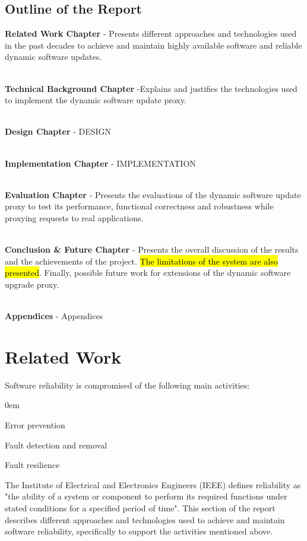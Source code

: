 \documentclass[a4paper,11pt,twoside]{report}
\begin{document}
\section{Outline of the Report}
\textbf{Related Work Chapter} - Presents different approaches and technologies used in the past decades to achieve and maintain highly available software and reliable dynamic software updates. 

\noindent \\
\textbf{Technical Background Chapter} -Explains and justifies the technologies used to implement the dynamic software update proxy.

\noindent \\
\textbf{ Design Chapter} - DESIGN

\noindent \\
\textbf{Implementation Chapter} - IMPLEMENTATION

\noindent \\
\textbf{Evaluation Chapter} - Presents the evaluations of the dynamic software update proxy to test its performance, functional correctness and robustness while proxying requests to real applications. 

\noindent \\
\textbf{Conclusion \& Future Chapter} - Presents the overall discussion of the results and the achievements of the project. \hl{The limitations of the system are also presented}. Finally, possible future work for extensions of the dynamic software upgrade proxy. 

\noindent \\
\textbf{Appendices} - Appendices

\chapter{Related Work}
Software reliability is compromised of the following main activities:

  \begin{list}{-}{}
  \itemsep0em
  \item Error prevention 
  
  \item Fault detection and removal
  
  \item Fault resilience
  \end{list}

\noindent
The Institute of Electrical and Electronics Engineers (IEEE) defines reliability as "the ability of a system or component to perform its required functions under stated conditions for a specified period of time". 
This section of the report describes different approaches and technologies used to achieve and maintain software reliability, specifically to support the activities mentioned above. 
\end{document}
